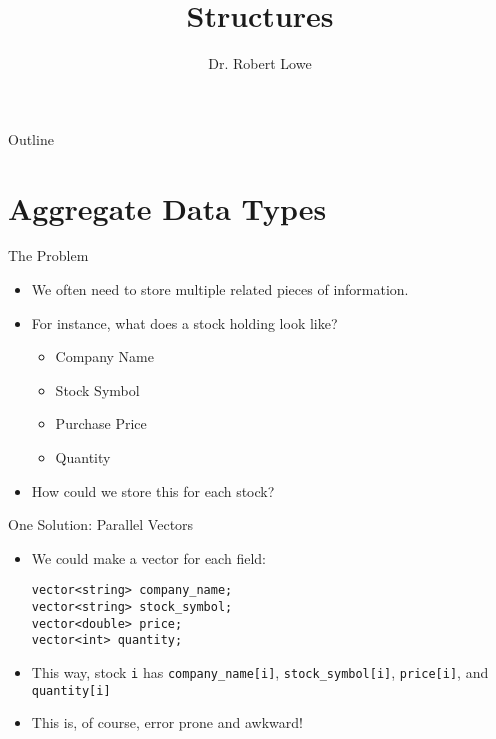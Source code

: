\documentclass[]{beamer}
\title{Structures}
\author{Dr. Robert Lowe\\}
\institute[Maryville College] %
{
  Division of Mathematics and Computer Science\\
  Maryville College
}
\date[]{}
\begin{document}
\begin{frame}
  \titlepage
\end{frame}

\begin{frame}{Outline}
  \tableofcontents
\end{frame}





\section{Aggregate Data Types}
\begin{frame}{The Problem}
    \begin{itemize}[<+->]
        \item We often need to store multiple related pieces of
            information.
        \item For instance, what does a stock holding look like?
        \begin{itemize}
            \item Company Name
            \item Stock Symbol
            \item Purchase Price
            \item Quantity
        \end{itemize}
        \item How could we store this for each stock?
    \end{itemize}
\end{frame}

\begin{frame}[fragile]{One Solution: Parallel Vectors}
    \begin{itemize}[<+->]
        \item We could make a vector for each field:
        \begin{verbatim}
vector<string> company_name;
vector<string> stock_symbol;
vector<double> price;
vector<int> quantity;
        \end{verbatim}
        \item This way, stock \texttt{i} has \texttt{company\_name[i]}, 
            \texttt{stock\_symbol[i]}, \texttt{price[i]}, and
            \texttt{quantity[i]}
        \item This is, of course, error prone and awkward!
    \end{itemize}
\end{frame}
\end{document}
